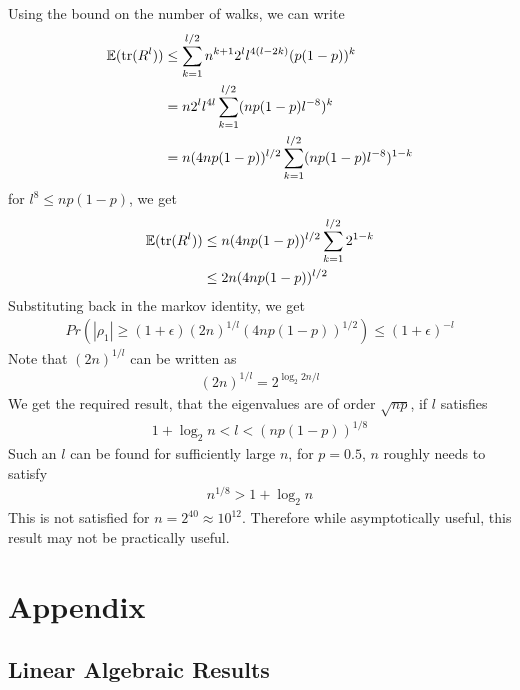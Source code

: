 \documentclass{math}
\newcommand{\expect}{\mathbb{E}}
\newcommand{\prob}{Pr}
\begin{document}
Using the bound on the number of walks, we can write
\begin{align*}
    \expect(\trace(R^l)) &\leq \sum_{k=1}^{l/2} n^{k + 1}2^ll^{4(l - 2k)} (p(1-p))^k \\
    &= n 2^l l^{4l} \sum_{k=1}^{l/2} (np(1-p)l^{-8})^k \\
    &= n (4np(1-p))^{l/2} \sum_{k=1}^{l/2} (np(1-p)l^{-8})^{1-k}
\end{align*}
for $l^8 \leq np(1-p)$, we get
\begin{align*}
    \expect(\trace(R^l)) &\leq n (4np(1-p))^{l/2} \sum_{k=1}^{l/2} 2^{1-k} \\
    &\leq 2n(4np(1-p))^{l/2}
\end{align*}
Substituting back in the markov identity, we get
\begin{align*}
    \prob(|\rho_1| \geq (1 + \epsilon) (2n)^{1/l}(4np(1-p))^{1/2}) \leq (1 + \epsilon)^{-l}
\end{align*}
Note that $(2n)^{1/l}$ can be written as
\begin{align*}
    (2n)^{1/l} = 2^{\log_2{2n}/l}
\end{align*}
We get the required result, that the eigenvalues are of order $\sqrt{np}$, if $l$ satisfies
\begin{align*}
    1 + \log_2{n} < l < (np(1-p))^{1/8}
\end{align*}
Such an $l$ can be found for sufficiently large $n$, for $p = 0.5$, $n$ roughly needs to satisfy
\begin{align*}
    n^{1/8} > 1 + \log_2 n
\end{align*}
This is not satisfied for $n = 2^{40} \approx 10^{12}$.
Therefore while asymptotically useful, this result may not be practically useful.

\section{Appendix}

\subsection{Linear Algebraic Results}
\end{document}
